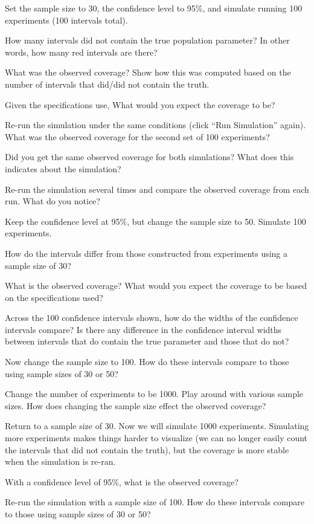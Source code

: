 \documentclass[
]{book}
\theoremstyle{definition}
\theoremstyle{definition}
\theoremstyle{definition}
\theoremstyle{remark}
\begin{document}
Set the sample size to 30, the confidence level to 95\%,
and simulate running 100 experiments (100 intervals total).

How many intervals did not contain the true population parameter? In other words, how many red intervals are there?

What was the observed coverage? Show how this was computed based on the number of intervals that did/did not contain the truth.

Given the specifications use, What would you expect the coverage to be?

Re-run the simulation under the same conditions (click ``Run Simulation'' again). What was the observed coverage for the second set of 100 experiments?

Did you get the same observed coverage for both simulations? What does this indicates about the simulation?

Re-run the simulation several times and compare the observed coverage from each run. What do you notice?

Keep the confidence level at 95\%, but change the sample size to 50. Simulate 100 experiments.

How do the intervals differ from those constructed from experiments using a sample size of 30?

What is the observed coverage? What would you expect the coverage to be based on the specifications used?

Across the 100 confidence intervals shown, how do the widths of the confidence intervals compare? Is there any difference in the confidence interval widths between intervals that do contain the true parameter and those that do not?

Now change the sample size to 100. How do these intervals compare to those using sample sizes of 30 or 50?

Change the number of experiments to be 1000. Play around with various sample sizes. How does changing the sample size effect the observed coverage?

Return to a sample size of 30. Now we will simulate 1000 experiments. Simulating more experiments makes things harder to visualize (we can no longer easily count the intervals that did not contain the truth), but the coverage is more stable when the simulation is re-ran.

With a confidence level of 95\%, what is the observed coverage?

Re-run the simulation with a sample size of 100. How do these intervals compare to those using sample sizes of 30 or 50?
\end{document}
